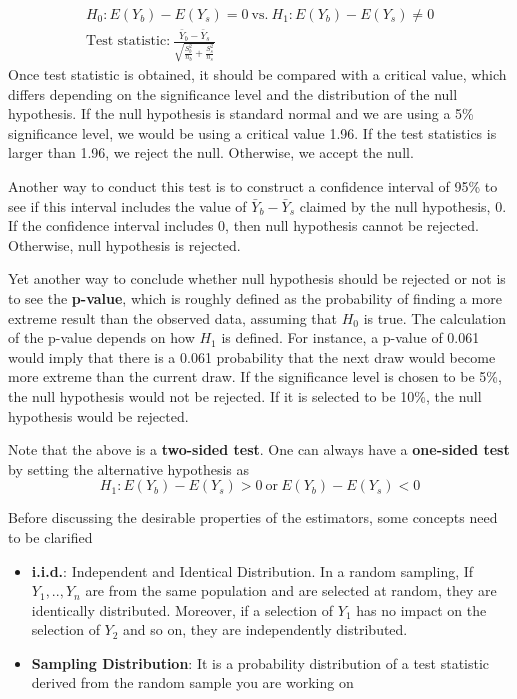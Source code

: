 \documentclass[12pt]{article}
\theoremstyle{definition}
\theoremstyle{property}
\theoremstyle{assumption}
\theoremstyle{example}
\theoremstyle{comment}
\begin{document}
\begin{gather*}
H_0: E(Y_b)-E(Y_s) = 0\ \text{vs.}\ H_1:E(Y_b)-E(Y_s) \neq 0\\
\text{Test statistic:} \ \frac{\bar{Y}_b-\bar{Y}_s}{\sqrt{\frac{S_b^2}{n_b}+\frac{S_s^2}{n_s}}}
\end{gather*}
Once test statistic is obtained, it should be compared with a critical value, which differs depending on the significance level and the distribution of the null hypothesis. If the null hypothesis is standard normal and we are using a 5\% significance level, we would be using a critical value 1.96. If the test statistics is larger than 1.96, we reject the null. Otherwise, we accept the null.
\par
 Another way to conduct this test is to construct a confidence interval of 95\% to see if this interval includes the value of 
$\bar{Y}_b-\bar{Y}_s$ claimed by the null hypothesis, 0. If the confidence interval includes 0, then null hypothesis cannot be rejected. Otherwise, null hypothesis is rejected.
\par\medskip

Yet another way to conclude whether null hypothesis should be rejected or not is to see the \textbf{p-value}, which is roughly defined as the probability of finding a more extreme result than the observed data, assuming that $H_0$ is true. The calculation of the p-value depends on how $H_1$ is defined. For instance, a p-value of 0.061 would imply that there is a 0.061 probability that the next draw would become more extreme than the current draw. If the significance level is chosen to be 5\%, the null hypothesis would not be rejected. If it is selected to be 10\%, the null hypothesis would be rejected. \par\medskip
Note that the above is a \textbf{two-sided test}. One can always have a \textbf{one-sided test} by setting the alternative hypothesis as 
\[
H_1 : E(Y_b)-E(Y_s )> 0 \ \text{or}\ E(Y_b)-E(Y_s) < 0
\] \par\medskip
Before discussing the desirable properties of the estimators, some concepts need to be clarified
\begin{itemize}
\item \textbf{i.i.d.}: Independent and Identical Distribution. In a random sampling, If $Y_1, .. , Y_n$ are from the same population and are selected at random, they are identically distributed. Moreover, if a selection of $Y_1$ has no impact on the selection of $Y_2$ and so on, they are independently distributed.
\item \textbf{Sampling Distribution}: It is a probability distribution of a test statistic derived from the random sample you are working on
\end{itemize} \medskip
\end{document}
